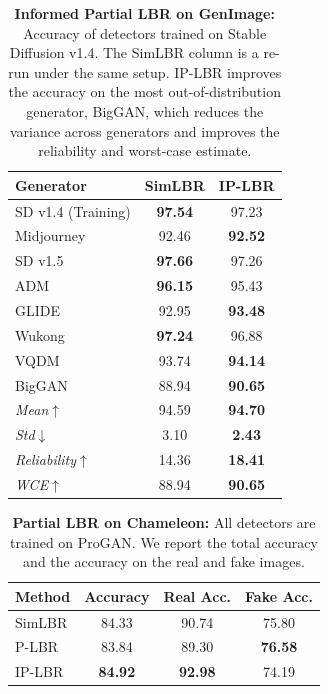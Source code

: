 \begin{table}[!t]
\centering
\small
\begin{tabular}{l|cc}
\hline
Generator & SimLBR & IP-LBR \\
\hline
SD v1.4 (Training) & \textbf{97.54} & 97.23 \\
\hline
Midjourney & 92.46 & \textbf{92.52} \\
SD v1.5    & \textbf{97.66} & 97.26 \\
ADM        & \textbf{96.15} & 95.43 \\
GLIDE      & 92.95 & \textbf{93.48} \\
Wukong     & \textbf{97.24} & 96.88 \\
VQDM       & 93.74 & \textbf{94.14} \\
BigGAN     & 88.94 & \textbf{90.65} \\
\hline
\textit{Mean}$\uparrow$        & 94.59 & \textbf{94.70} \\
\textit{Std}$\downarrow$         & 3.10 & \textbf{2.43} \\
\textit{Reliability}$\uparrow$ & 14.36 & \textbf{18.41} \\
\textit{WCE}$\uparrow$         & 88.94 & \textbf{90.65} \\
\hline
\end{tabular}
\caption{\textbf{Informed Partial LBR on GenImage:} Accuracy of detectors trained on Stable Diffusion v1.4. The SimLBR column is a re-run under the same setup. IP-LBR improves the accuracy on the most out-of-distribution generator, BigGAN, which reduces the variance across generators and improves the reliability and worst-case estimate.}
\label{table:plbr_genimage}
\end{table}

\begin{table}[!t]
\centering
\begin{tabular}{l|ccc}
\hline
Method & Accuracy & Real Acc. & Fake Acc. \\
\hline
SimLBR   & 84.33 & 90.74 & 75.80 \\
P-LBR    & 83.84 & 89.30 & \textbf{76.58} \\
IP-LBR   & \textbf{84.92} & \textbf{92.98} & 74.19 \\
\hline
\end{tabular}
\caption{\textbf{Partial LBR on Chameleon:} All detectors are trained on ProGAN. We report the total accuracy and the accuracy on the real and fake images.}
\label{table:plbr_chameleon}
\end{table}

